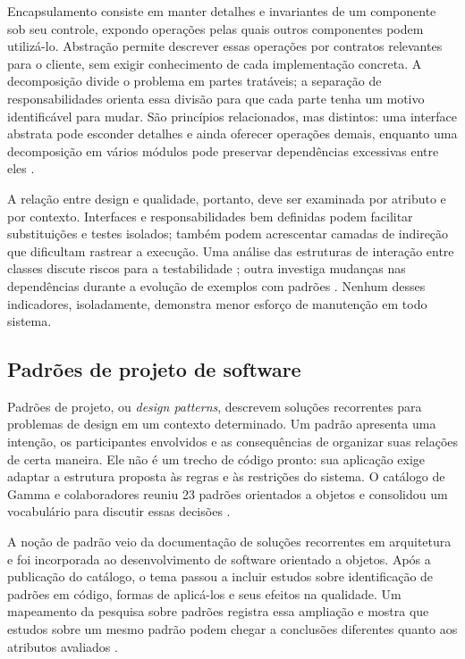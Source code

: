\documentclass[12pt]{article}
\begin{document}
Encapsulamento consiste em manter detalhes e invariantes de um componente sob seu controle, expondo operações pelas quais outros componentes podem utilizá-lo. Abstração permite descrever essas operações por contratos relevantes para o cliente, sem exigir conhecimento de cada implementação concreta. A decomposição divide o problema em partes tratáveis; a separação de responsabilidades orienta essa divisão para que cada parte tenha um motivo identificável para mudar. São princípios relacionados, mas distintos: uma interface abstrata pode esconder detalhes e ainda oferecer operações demais, enquanto uma decomposição em vários módulos pode preservar dependências excessivas entre eles \cite{gamma1994}.

A relação entre design e qualidade, portanto, deve ser examinada por atributo e por contexto. Interfaces e responsabilidades bem definidas podem facilitar substituições e testes isolados; também podem acrescentar camadas de indireção que dificultam rastrear a execução. Uma análise das estruturas de interação entre classes discute riscos para a testabilidade \cite{baudry2003}; outra investiga mudanças nas dependências durante a evolução de exemplos com padrões \cite{hsu2024}. Nenhum desses indicadores, isoladamente, demonstra menor esforço de manutenção em todo sistema.

\subsection{Padrões de projeto de software}

Padrões de projeto, ou \emph{design patterns}, descrevem soluções recorrentes para problemas de design em um contexto determinado. Um padrão apresenta uma intenção, os participantes envolvidos e as consequências de organizar suas relações de certa maneira. Ele não é um trecho de código pronto: sua aplicação exige adaptar a estrutura proposta às regras e às restrições do sistema. O catálogo de Gamma e colaboradores reuniu 23 padrões orientados a objetos e consolidou um vocabulário para discutir essas decisões \cite{gamma1994}.

A noção de padrão veio da documentação de soluções recorrentes em arquitetura e foi incorporada ao desenvolvimento de software orientado a objetos. Após a publicação do catálogo, o tema passou a incluir estudos sobre identificação de padrões em código, formas de aplicá-los e seus efeitos na qualidade. Um mapeamento da pesquisa sobre padrões registra essa ampliação e mostra que estudos sobre um mesmo padrão podem chegar a conclusões diferentes quanto aos atributos avaliados \cite{ampatzoglou2013}.
\end{document}
